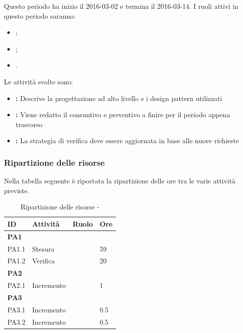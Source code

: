 \documentclass[12pt,a4paper]{article}
\begin{document}
Questo periodo ha inizio il 2016-03-02 e termina il 2016-03-14. 
I ruoli attivi in questo periodo saranno:

\begin{itemize}
	\item \PR{};
    \item \RE{};
	\item \VR{}.
\end{itemize}

Le attività svolte sono:

\begin{itemize}
	\item \textbf{\ST{}:} Descrive la progettazione ad alto livello e i design pattern utilizzati
	\item \textbf{\PdP{}:} Viene redatto il consuntivo e preventivo a finire per il periodo appena trascorso
	\item \textbf{\PdQ{}:} La strategia di verifica deve essere aggiornata in base alle nuove richieste
\end{itemize}

\subsubsection{Ripartizione delle risorse}
Nella tabella seguente è riportata la ripartizione delle ore tra le varie attività previste.

\begin{table}[H]
	\begin{center}
		\begin{tabular}{p{} p{} p{} p{}}
			\toprule
			\textbf{ID}	& \textbf{Attività}	& \textbf{Ruolo} & \textbf{Ore}\\ \midrule
			\midrule
			\textbf{PA1} & \textbf{\ST{}} & &  \\ \midrule
			PA1.1 & Stesura & \PG{} & 59 \\ \midrule
			PA1.2 & Verifica & \VR{} & 20 \\ \midrule
            \textbf{PA2} & \textbf{\PdP{}} & &  \\ \midrule
			PA2.1 & Incremento & \RE{} & 1 \\ \midrule
	        \textbf{PA3} & \textbf{\PdQ{}} & &  \\ \midrule
	        PA3.1 & Incremento & \RE{} & 0.5 \\ \midrule
	        PA3.2 & Incremento & \RE{} & 0.5 \\ \midrule
			\bottomrule
		\end{tabular}
		\caption{Ripartizione delle risorse - \FPA{}}
	\end{center}
\end{table}
\end{document}
